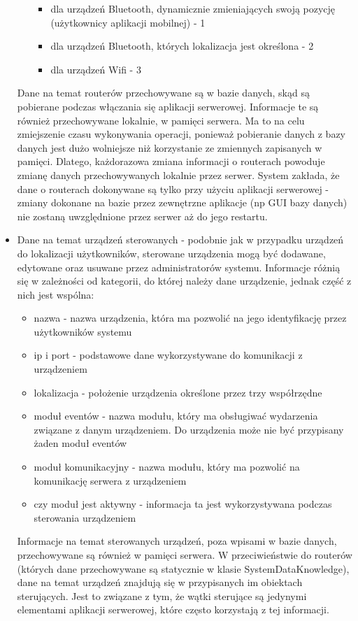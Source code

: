 \documentclass{article}
\begin{document}
\begin{itemize}
\begin{itemize}
\begin{itemize}
					\item dla urządzeń Bluetooth, dynamicznie zmieniających swoją pozycję (użytkownicy aplikacji mobilnej) - 1
					\item dla urządzeń Bluetooth, których lokalizacja jest określona - 2
					\item dla urządzeń Wifi - 3
				\end{itemize}
			\end{itemize}
			Dane na temat routerów przechowywane są w bazie danych, skąd są pobierane podczas włączania się aplikacji serwerowej. Informacje te są również przechowywane lokalnie, w pamięci serwera. Ma to na celu zmiejszenie czasu wykonywania operacji, ponieważ pobieranie danych z bazy danych jest dużo wolniejsze niż korzystanie ze zmiennych zapisanych w pamięci. Dlatego, każdorazowa zmiana informacji o routerach powoduje zmianę danych przechowywanych lokalnie przez serwer. System zakłada, że dane o routerach dokonywane są tylko przy użyciu aplikacji serwerowej - zmiany dokonane na bazie przez zewnętrzne aplikacje (np GUI bazy danych) nie zostaną uwzględnione przez serwer aż do jego restartu.
			\item Dane na temat urządzeń sterowanych - podobnie jak w przypadku urządzeń do lokalizacji użytkowników, sterowane urządzenia mogą być dodawane, edytowane oraz usuwane przez administratorów systemu. Informacje różnią się w zależności od kategorii, do której należy dane urządzenie, jednak część z nich jest wspólna:
			\begin{itemize}
				\item nazwa - nazwa urządzenia, która ma pozwolić na jego identyfikację przez użytkowników systemu
				\item ip i port - podstawowe dane wykorzystywane do komunikacji z urządzeniem
				\item lokalizacja - położenie urządzenia określone przez trzy współrzędne
				\item moduł eventów - nazwa modułu, który ma obsługiwać wydarzenia związane z danym urządzeniem. Do urządzenia może nie być przypisany żaden moduł eventów
				\item moduł komunikacyjny - nazwa modułu, który ma pozwolić na komunikację serwera z urządzeniem
				\item czy moduł jest aktywny - informacja ta jest wykorzystywana podczas sterowania urządzeniem 
			\end{itemize}
			Informacje na temat sterowanych urządzeń, poza wpisami w bazie danych, przechowywane są również w pamięci serwera. W przeciwieństwie do routerów (których dane przechowywane są statycznie w klasie SystemDataKnowledge), dane na temat urządzeń znajdują się w przypisanych im obiektach sterujących. Jest to związane z tym, że wątki sterujące są jedynymi elementami aplikacji serwerowej, które często korzystają z tej informacji.\\

\end{itemize}
\end{document}
